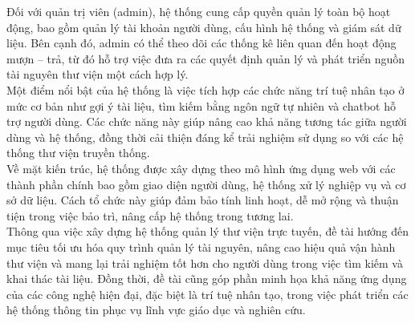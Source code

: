 Đối với quản trị viên (admin), hệ thống cung cấp quyền quản lý toàn bộ hoạt động, bao gồm quản lý tài khoản người dùng, cấu hình hệ thống và giám sát dữ liệu. Bên cạnh đó, admin có thể theo dõi các thống kê liên quan đến hoạt động mượn – trả, từ đó hỗ trợ việc đưa ra các quyết định quản lý và phát triển nguồn tài nguyên thư viện một cách hợp lý.\\

Một điểm nổi bật của hệ thống là việc tích hợp các chức năng trí tuệ nhân tạo ở mức cơ bản như gợi ý tài liệu, tìm kiếm bằng ngôn ngữ tự nhiên và chatbot hỗ trợ người dùng. Các chức năng này giúp nâng cao khả năng tương tác giữa người dùng và hệ thống, đồng thời cải thiện đáng kể trải nghiệm sử dụng so với các hệ thống thư viện truyền thống.\\

Về mặt kiến trúc, hệ thống được xây dựng theo mô hình ứng dụng web với các thành phần chính bao gồm giao diện người dùng, hệ thống xử lý nghiệp vụ và cơ sở dữ liệu. Cách tổ chức này giúp đảm bảo tính linh hoạt, dễ mở rộng và thuận tiện trong việc bảo trì, nâng cấp hệ thống trong tương lai.\\

Thông qua việc xây dựng hệ thống quản lý thư viện trực tuyến, đề tài hướng đến mục tiêu tối ưu hóa quy trình quản lý tài nguyên, nâng cao hiệu quả vận hành thư viện và mang lại trải nghiệm tốt hơn cho người dùng trong việc tìm kiếm và khai thác tài liệu. Đồng thời, đề tài cũng góp phần minh họa khả năng ứng dụng của các công nghệ hiện đại, đặc biệt là trí tuệ nhân tạo, trong việc phát triển các hệ thống thông tin phục vụ lĩnh vực giáo dục và nghiên cứu.\\

\clearpage
{}
